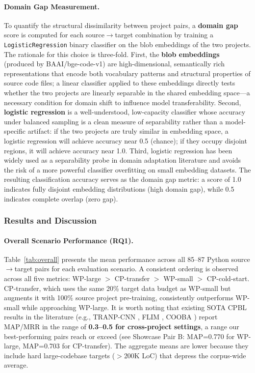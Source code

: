 \documentclass[12pt,table,xcdraw]{article}
\begin{document}
\paragraph{Domain Gap Measurement.}
To quantify the structural dissimilarity between project pairs, a \textbf{domain gap} score is computed for each source$\rightarrow$target combination by training a \texttt{LogisticRegression} binary classifier on the blob embeddings of the two projects. The rationale for this choice is three-fold. First, the \textbf{blob embeddings} (produced by BAAI/bge-code-v1) are high-dimensional, semantically rich representations that encode both vocabulary patterns and structural properties of source code files; a linear classifier applied to these embeddings directly tests whether the two projects are linearly separable in the shared embedding space---a necessary condition for domain shift to influence model transferability. Second, \textbf{logistic regression} is a well-understood, low-capacity classifier whose accuracy under balanced sampling is a clean measure of separability rather than a model-specific artifact: if the two projects are truly similar in embedding space, a logistic regression will achieve accuracy near 0.5 (chance); if they occupy disjoint regions, it will achieve accuracy near 1.0. Third, logistic regression has been widely used as a separability probe in domain adaptation literature and avoids the risk of a more powerful classifier overfitting on small embedding datasets. The resulting classification accuracy serves as the domain gap metric: a score of 1.0 indicates fully disjoint embedding distributions (high domain gap), while 0.5 indicates complete overlap (zero gap).

\subsubsection{Results and Discussion}

\paragraph{Overall Scenario Performance (RQ1).}
Table~\ref{tab:overall} presents the mean performance across all 85--87 Python source$\rightarrow$target pairs for each evaluation scenario. A consistent ordering is observed across all five metrics: WP-large $>$ CP-transfer $>$ WP-small $>$ CP-cold-start. CP-transfer, which uses the same 20\% target data budget as WP-small but augments it with 100\% source project pre-training, consistently outperforms WP-small while approaching WP-large. It is worth noting that existing SOTA CPBL results in the literature (e.g., TRANP-CNN \cite{huo2019deep}, FLIM \cite{liang2022modeling}, COOBA \cite{zhu2020cooba}) report MAP/MRR in the range of \textbf{0.3--0.5 for cross-project settings}, a range our best-performing pairs reach or exceed (see Showcase Pair B: MAP=0.770 for WP-large, MAP=0.703 for CP-transfer). The aggregate means are lower because they include hard large-codebase targets ($>$200K LoC) that depress the corpus-wide average.
\end{document}
